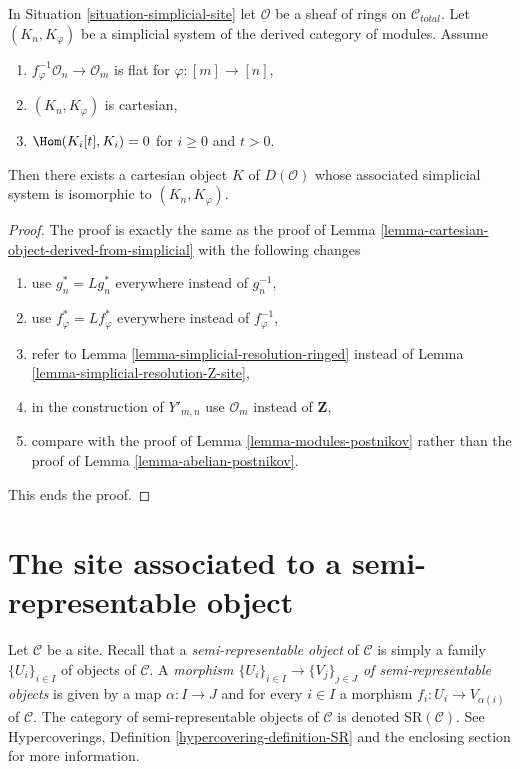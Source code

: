 \begin{lemma}
\label{lemma-cartesian-module-derived-from-simplicial}
In Situation \ref{situation-simplicial-site} let $\mathcal{O}$ be
a sheaf of rings on $\mathcal{C}_{total}$. Let
$(K_n, K_\varphi)$ be a simplicial system of the derived category
of modules. Assume
\begin{enumerate}
\item $f_\varphi^{-1}\mathcal{O}_n \to \mathcal{O}_m$ is flat for
$\varphi : [m] \to [n]$,
\item $(K_n, K_\varphi)$ is cartesian,
\item $\Hom(K_i[t], K_i) = 0$ for $i \geq 0$ and $t > 0$.
\end{enumerate}
Then there exists a cartesian object $K$ of $D(\mathcal{O})$
whose associated simplicial system is isomorphic to $(K_n, K_\varphi)$.
\end{lemma}

\begin{proof}
The proof is exactly the same as the proof of
Lemma \ref{lemma-cartesian-object-derived-from-simplicial}
with the following changes
\begin{enumerate}
\item use $g_n^* = Lg_n^*$ everywhere instead of $g_n^{-1}$,
\item use $f_\varphi^* = Lf_\varphi^*$ everywhere instead of $f_\varphi^{-1}$,
\item refer to Lemma \ref{lemma-simplicial-resolution-ringed}
instead of Lemma \ref{lemma-simplicial-resolution-Z-site},
\item in the construction of $Y'_{m, n}$ use
$\mathcal{O}_m$ instead of $\mathbf{Z}$,
\item compare with the proof of Lemma \ref{lemma-modules-postnikov}
rather than the proof of Lemma \ref{lemma-abelian-postnikov}.
\end{enumerate}
This ends the proof.
\end{proof}







\section{The site associated to a semi-representable object}
\label{section-semi-representable}

\noindent
Let $\mathcal{C}$ be a site. Recall that a {\it semi-representable object}
of $\mathcal{C}$ is simply a family $\{U_i\}_{i \in I}$
of objects of $\mathcal{C}$. A
{\it morphism $\{U_i\}_{i \in I} \to \{V_j\}_{j \in J}$ of
semi-representable objects} is given by a map $\alpha : I \to J$
and for every $i \in I$ a morphism $f_i : U_i \to V_{\alpha(i)}$
of $\mathcal{C}$.
The category of semi-representable objects of $\mathcal{C}$
is denoted $\text{SR}(\mathcal{C})$.
See Hypercoverings, Definition \ref{hypercovering-definition-SR}
and the enclosing section for more information.


